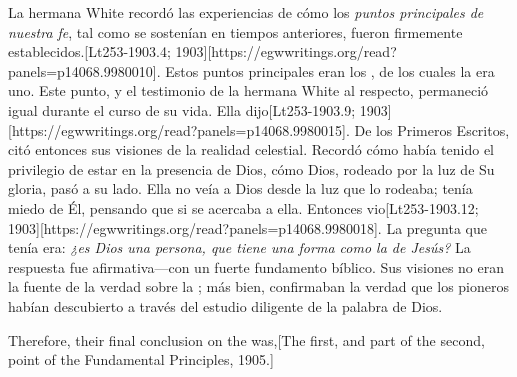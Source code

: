 La hermana White recordó las experiencias de cómo los \textit{puntos principales de nuestra fe}, tal como se sostenían en tiempos anteriores, fueron firmemente establecidos.[Lt253-1903.4; 1903][https://egwwritings.org/read?panels=p14068.9980010]. Estos puntos principales eran los , de los cuales la  era uno. Este punto, y el testimonio de la hermana White al respecto, permaneció igual durante el curso de su vida. Ella dijo[Lt253-1903.9; 1903][https://egwwritings.org/read?panels=p14068.9980015]. De los Primeros Escritos, citó entonces sus visiones de la realidad celestial. Recordó cómo había tenido el privilegio de estar en la presencia de Dios, cómo Dios, rodeado por la luz de Su gloria, pasó a su lado. Ella no veía a Dios desde la luz que lo rodeaba; tenía miedo de Él, pensando que si se acercaba a ella. Entonces vio[Lt253-1903.12; 1903][https://egwwritings.org/read?panels=p14068.9980018]. La pregunta que tenía era: \textit{¿es Dios una persona, que tiene una forma como la de Jesús?} La respuesta fue afirmativa—con un fuerte fundamento bíblico. Sus visiones no eran la fuente de la verdad sobre la ; más bien, confirmaban la verdad que los pioneros habían descubierto a través del estudio diligente de la palabra de Dios.


Therefore, their final conclusion on the  was,[The first, and part of the second, point of the Fundamental Principles, 1905.]


